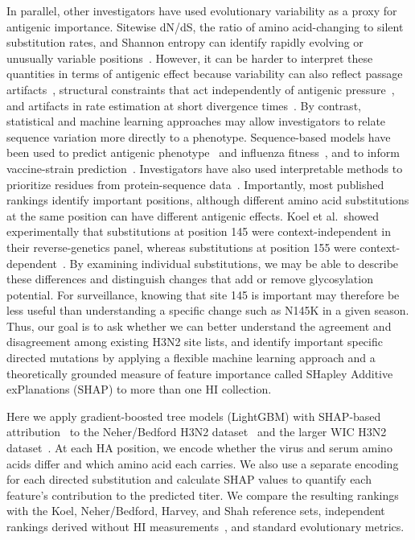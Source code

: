 \documentclass[12pt]{article}
\begin{document}
In parallel, other investigators have used evolutionary variability as a proxy for antigenic importance. Sitewise dN/dS, the ratio of amino acid-changing to silent substitution rates, and Shannon entropy can identify rapidly evolving or unusually variable positions~\cite{fitch1991positive, NeiGojobori1986, suzuki2006natural, pan2011quantifying}. However, it can be harder to interpret these quantities in terms of antigenic effect because variability can also reflect passage artifacts~\cite{McWhite2016VE_passage}, structural constraints that act independently of antigenic pressure~\cite{Meyer2015PP_geom, echave2016causes}, and artifacts in rate estimation at short divergence times~\cite{Meyer2015VE_time, Ho2005MBE}. By contrast, statistical and machine learning approaches may allow investigators to relate sequence variation more directly to a phenotype. Sequence-based models have been used to predict antigenic phenotype~\cite{xia2021deep} and influenza fitness~\cite{Luksza2014Nature}, and to inform vaccine-strain prediction~\cite{Steinbruck2014JVirol}. Investigators have also used interpretable methods to prioritize residues from protein-sequence data~\cite{hie2021learning, thadani2023learning}. Importantly, most published rankings identify important positions, although different amino acid substitutions at the same position can have different antigenic effects. Koel et al.\ showed experimentally that substitutions at position 145 were context-independent in their reverse-genetics panel, whereas substitutions at position 155 were context-dependent~\cite{Koel2019JGenVirol}. By examining individual substitutions, we may be able to describe these differences and distinguish changes that add or remove glycosylation potential. For surveillance, knowing that site 145 is important may therefore be less useful than understanding a specific change such as N145K in a given season. Thus, our goal is to ask whether we can better understand the agreement and disagreement among existing H3N2 site lists, and identify important specific directed mutations by applying a flexible machine learning approach and a theoretically grounded measure of feature importance called SHapley Additive exPlanations (SHAP) to more than one HI collection.

Here we apply gradient-boosted tree models (LightGBM) with SHAP-based attribution~\cite{Lundberg2017, Lundberg2020NatMachIntell} to the Neher/Bedford H3N2 dataset~\cite{Neher2016PNAS} and the larger WIC H3N2 dataset~\cite{Harvey2023PLoSComputBiol}. At each HA position, we encode whether the virus and serum amino acids differ and which amino acid each carries. We also use a separate encoding for each directed substitution and calculate SHAP values to quantify each feature's contribution to the predicted titer. We compare the resulting rankings with the Koel, Neher/Bedford, Harvey, and Shah reference sets, independent rankings derived without HI measurements~\cite{Meyer2026Interface_sequenceML}, and standard evolutionary metrics.
\end{document}
